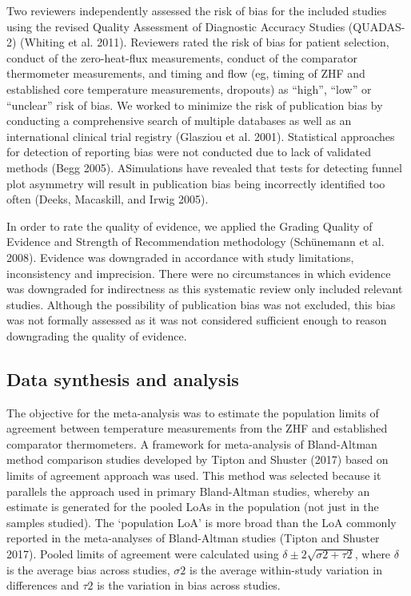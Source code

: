 \documentclass[smallextended]{svjour3}       %
\begin{document}
Two reviewers independently assessed the risk of bias for the included
studies using the revised Quality Assessment of Diagnostic Accuracy
Studies (QUADAS-2) (Whiting et al. 2011). Reviewers rated the risk of
bias for patient selection, conduct of the zero-heat-flux measurements,
conduct of the comparator thermometer measurements, and timing and flow
(eg, timing of ZHF and established core temperature measurements,
dropouts) as ``high'', ``low'' or ``unclear'' risk of bias. We worked to
minimize the risk of publication bias by conducting a comprehensive
search of multiple databases as well as an international clinical trial
registry (Glasziou et al. 2001). Statistical approaches for detection of
reporting bias were not conducted due to lack of validated methods (Begg
2005). ASimulations have revealed that tests for detecting funnel plot
asymmetry will result in publication bias being incorrectly identified
too often (Deeks, Macaskill, and Irwig 2005).

In order to rate the quality of evidence, we applied the Grading Quality
of Evidence and Strength of Recommendation methodology (Schünemann et
al. 2008). Evidence was downgraded in accordance with study limitations,
inconsistency and imprecision. There were no circumstances in which
evidence was downgraded for indirectness as this systematic review only
included relevant studies. Although the possibility of publication bias
was not excluded, this bias was not formally assessed as it was not
considered sufficient enough to reason downgrading the quality of
evidence.

\hypertarget{data-synthesis-and-analysis}{%
\subsection{Data synthesis and
analysis}\label{data-synthesis-and-analysis}}

The objective for the meta-analysis was to estimate the population
limits of agreement between temperature measurements from the ZHF and
established comparator thermometers. A framework for meta-analysis of
Bland-Altman method comparison studies developed by Tipton and Shuster
(2017) based on limits of agreement approach was used. This method was
selected because it parallels the approach used in primary Bland-Altman
studies, whereby an estimate is generated for the pooled LoAs in the
population (not just in the samples studied). The `population LoA' is
more broad than the LoA commonly reported in the meta-analyses of
Bland-Altman studies (Tipton and Shuster 2017). Pooled limits of
agreement were calculated using \(\delta\pm2\sqrt{\sigma2+\tau2}\),
where \(\delta\) is the average bias across studies, \(\sigma2\) is the
average within-study variation in differences and \(\tau2\) is the
variation in bias across studies.
\end{document}
